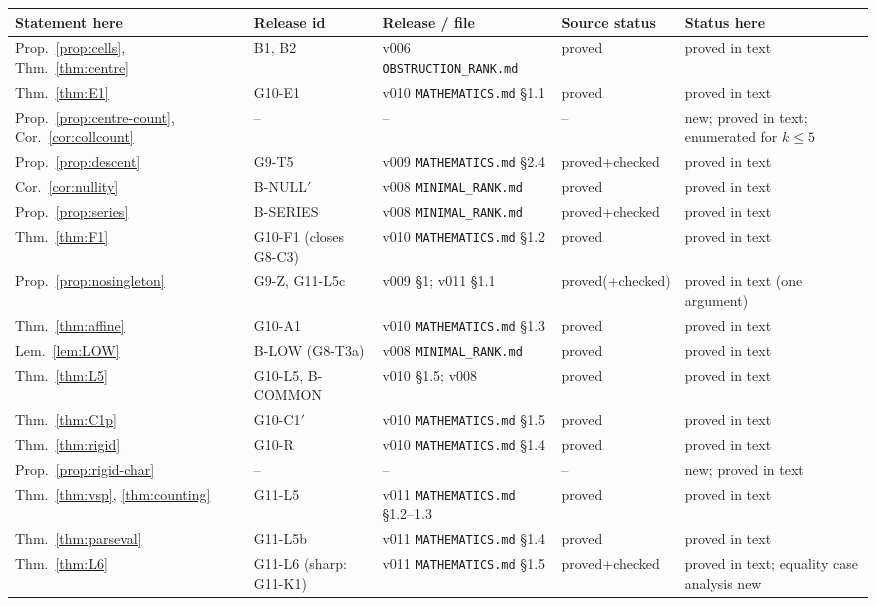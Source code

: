 \begingroup\scriptsize
\setlength{\tabcolsep}{3pt}
\begin{longtable}{@{}p{2.6cm}p{2.0cm}p{3.4cm}p{2.0cm}p{3.6cm}@{}}
\toprule
Statement here & Release id & Release / file & Source status & Status here\\\midrule\endhead
Prop.~\ref{prop:cells}, Thm.~\ref{thm:centre} & B1, B2 & v006 \texttt{OBSTRUCTION\_RANK.md} & proved & proved in text\\
Thm.~\ref{thm:E1} & G10-E1 & v010 \texttt{MATHEMATICS.md} \S1.1 & proved & proved in text\\
Prop.~\ref{prop:centre-count}, Cor.~\ref{cor:collcount} & -- & -- & -- & new; proved in text; enumerated for $k\le5$\\
Prop.~\ref{prop:descent} & G9-T5 & v009 \texttt{MATHEMATICS.md} \S2.4 & proved+checked & proved in text\\
Cor.~\ref{cor:nullity} & B-NULL$'$ & v008 \texttt{MINIMAL\_RANK.md} & proved & proved in text\\
Prop.~\ref{prop:series} & B-SERIES & v008 \texttt{MINIMAL\_RANK.md} & proved+checked & proved in text\\
Thm.~\ref{thm:F1} & G10-F1 (closes G8-C3) & v010 \texttt{MATHEMATICS.md} \S1.2 & proved & proved in text\\
Prop.~\ref{prop:nosingleton} & G9-Z, G11-L5c & v009 \S1; v011 \S1.1 & proved(+checked) & proved in text (one argument)\\
Thm.~\ref{thm:affine} & G10-A1 & v010 \texttt{MATHEMATICS.md} \S1.3 & proved & proved in text\\
Lem.~\ref{lem:LOW} & B-LOW (G8-T3a) & v008 \texttt{MINIMAL\_RANK.md} & proved & proved in text\\
Thm.~\ref{thm:L5} & G10-L5, B-COMMON & v010 \S1.5; v008 & proved & proved in text\\
Thm.~\ref{thm:C1p} & G10-C1$'$ & v010 \texttt{MATHEMATICS.md} \S1.5 & proved & proved in text\\
Thm.~\ref{thm:rigid} & G10-R & v010 \texttt{MATHEMATICS.md} \S1.4 & proved & proved in text\\
Prop.~\ref{prop:rigid-char} & -- & -- & -- & new; proved in text\\
Thm.~\ref{thm:vsp}, \ref{thm:counting} & G11-L5 & v011 \texttt{MATHEMATICS.md} \S1.2--1.3 & proved & proved in text\\
Thm.~\ref{thm:parseval} & G11-L5b & v011 \texttt{MATHEMATICS.md} \S1.4 & proved & proved in text\\
Thm.~\ref{thm:L6} & G11-L6 (sharp: G11-K1) & v011 \texttt{MATHEMATICS.md} \S1.5 & proved+checked & proved in text; equality case analysis new\\

\end{longtable}
